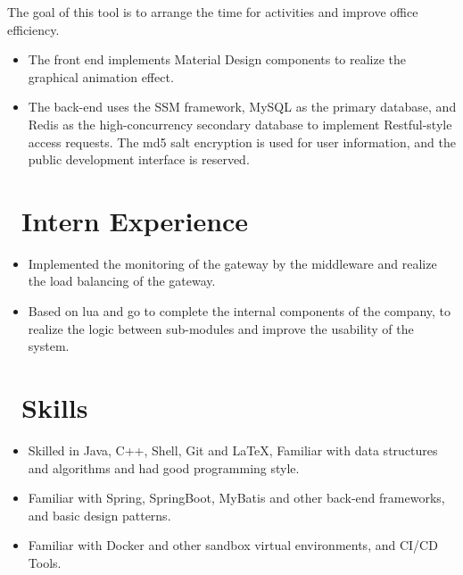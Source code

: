 \documentclass{resume}
\begin{document}
The goal of this tool is to arrange the time for activities and improve office efficiency.
\begin{itemize}
  \item The front end implements Material Design components to realize the graphical animation effect.
  \item The back-end uses the SSM framework, MySQL as the primary database, and Redis as the high-concurrency secondary database to implement Restful-style access requests. The md5 salt encryption is used for user information, and the public development interface is reserved.
\end{itemize}

\section{\faSitemap\ Intern Experience}

\begin{itemize}
  \item Implemented the monitoring of the gateway by the middleware and realize the load balancing of the gateway.
  \item Based on lua and go to complete the internal components of the company, to realize the logic between sub-modules and improve the usability of the system.
\end{itemize}


\section{\faCogs\ Skills}
\begin{itemize}[parsep=0.5ex]
  \item Skilled in Java, C++, Shell, Git and \LaTeX, Familiar with data structures and algorithms and had good programming style.
  \item Familiar with Spring, SpringBoot, MyBatis and other back-end frameworks, and basic design patterns.
  \item Familiar with Docker and other sandbox virtual environments, and CI/CD Tools.
\end{itemize}
\end{document}
